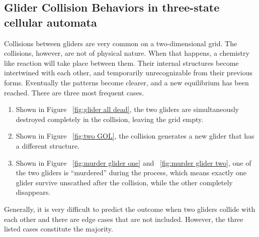 \documentclass[12pt]{article}
\numberwithin{figure}{section} %
\begin{document}
\subsection{Glider Collision Behaviors in three-state cellular automata}
Collisions between gliders are very common on a two-dimensional grid. The collisions, however, are not of physical nature. When that happens, a chemistry like reaction will take place between them. Their internal structures become intertwined with each other, and temporarily unrecognizable from their previous forms. Eventually the patterns become clearer, and a new equilibrium has been reached. There are three most frequent cases. 
\begin{enumerate}[topsep=0pt,itemsep=-1ex,partopsep=1ex,parsep=1ex]
\item Shown in Figure ~\ref{fig:glider all dead}, the two gliders are simultaneously destroyed completely in the collision, leaving the grid empty. 
\item Shown in Figure ~\ref{fig:two GOL}, the collision generates a new glider that has a different structure. 
\item Shown in Figure ~\ref{fig:murder glider one} and ~\ref{fig:murder glider two}, one of the two gliders is “murdered” during the process, which means exactly one glider survive unscathed after the collision, while the other completely disappears.
\end{enumerate}
Generally, it is very difficult to predict the outcome when two gliders collide with each other and there are edge cases that are not included. However, the three listed cases constitute the majority. 
\end{document}
